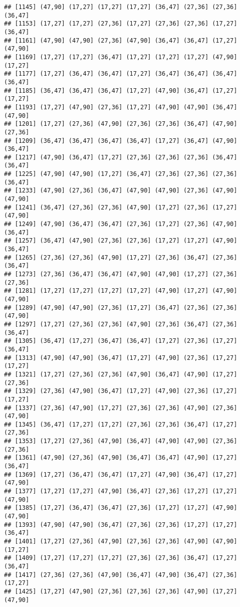 \documentclass[12pt,]{article}
\begin{document}
\begin{verbatim}
## [1145] (47,90] (17,27] (17,27] (17,27] (36,47] (27,36] (27,36] (36,47]
## [1153] (17,27] (17,27] (27,36] (17,27] (27,36] (27,36] (17,27] (36,47]
## [1161] (47,90] (47,90] (27,36] (47,90] (36,47] (36,47] (17,27] (47,90]
## [1169] (17,27] (17,27] (36,47] (17,27] (17,27] (17,27] (47,90] (17,27]
## [1177] (17,27] (36,47] (36,47] (17,27] (36,47] (36,47] (36,47] (36,47]
## [1185] (36,47] (36,47] (36,47] (17,27] (47,90] (36,47] (17,27] (17,27]
## [1193] (17,27] (47,90] (27,36] (17,27] (47,90] (47,90] (36,47] (47,90]
## [1201] (17,27] (27,36] (47,90] (27,36] (27,36] (36,47] (47,90] (27,36]
## [1209] (36,47] (36,47] (36,47] (36,47] (17,27] (36,47] (47,90] (36,47]
## [1217] (47,90] (36,47] (17,27] (27,36] (27,36] (27,36] (36,47] (36,47]
## [1225] (47,90] (47,90] (17,27] (36,47] (27,36] (27,36] (27,36] (36,47]
## [1233] (47,90] (27,36] (36,47] (47,90] (47,90] (27,36] (47,90] (47,90]
## [1241] (36,47] (27,36] (27,36] (47,90] (17,27] (27,36] (17,27] (47,90]
## [1249] (47,90] (36,47] (36,47] (27,36] (17,27] (27,36] (47,90] (36,47]
## [1257] (36,47] (47,90] (27,36] (27,36] (17,27] (17,27] (47,90] (36,47]
## [1265] (27,36] (27,36] (47,90] (17,27] (27,36] (36,47] (27,36] (36,47]
## [1273] (27,36] (36,47] (36,47] (47,90] (47,90] (17,27] (27,36] (27,36]
## [1281] (17,27] (17,27] (17,27] (17,27] (47,90] (17,27] (47,90] (47,90]
## [1289] (47,90] (47,90] (27,36] (17,27] (36,47] (27,36] (27,36] (47,90]
## [1297] (17,27] (27,36] (27,36] (47,90] (27,36] (36,47] (27,36] (36,47]
## [1305] (36,47] (17,27] (36,47] (36,47] (17,27] (27,36] (17,27] (36,47]
## [1313] (47,90] (47,90] (36,47] (17,27] (47,90] (27,36] (17,27] (17,27]
## [1321] (17,27] (27,36] (27,36] (47,90] (36,47] (47,90] (17,27] (27,36]
## [1329] (27,36] (47,90] (36,47] (17,27] (47,90] (27,36] (17,27] (17,27]
## [1337] (27,36] (47,90] (17,27] (27,36] (27,36] (47,90] (27,36] (47,90]
## [1345] (36,47] (17,27] (17,27] (27,36] (27,36] (36,47] (17,27] (27,36]
## [1353] (17,27] (27,36] (47,90] (36,47] (47,90] (47,90] (27,36] (27,36]
## [1361] (47,90] (27,36] (47,90] (36,47] (36,47] (47,90] (17,27] (36,47]
## [1369] (17,27] (36,47] (36,47] (17,27] (47,90] (36,47] (17,27] (47,90]
## [1377] (17,27] (17,27] (47,90] (36,47] (27,36] (17,27] (17,27] (47,90]
## [1385] (17,27] (36,47] (36,47] (27,36] (17,27] (17,27] (47,90] (47,90]
## [1393] (47,90] (47,90] (36,47] (27,36] (27,36] (17,27] (17,27] (36,47]
## [1401] (17,27] (27,36] (47,90] (27,36] (27,36] (47,90] (47,90] (17,27]
## [1409] (17,27] (17,27] (17,27] (27,36] (27,36] (36,47] (17,27] (36,47]
## [1417] (27,36] (27,36] (47,90] (36,47] (47,90] (36,47] (27,36] (17,27]
## [1425] (17,27] (47,90] (27,36] (27,36] (27,36] (47,90] (17,27] (47,90]

\end{verbatim}
\end{document}
